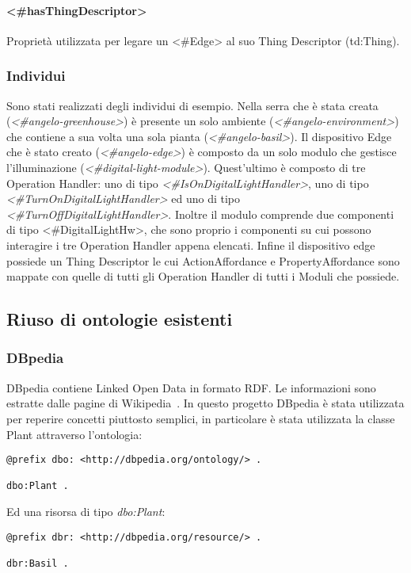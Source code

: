 \paragraph{<\#hasThingDescriptor>}
Proprietà utilizzata per legare un <\#Edge> al suo Thing Descriptor (td:Thing).

\subsubsection{Individui}
Sono stati realizzati degli individui di esempio. Nella serra che è stata creata (\textit{<\#angelo-greenhouse>}) è presente un solo ambiente (\textit{<\#angelo-environment>}) che contiene a sua volta una sola pianta (\textit{<\#angelo-basil>}). Il dispositivo Edge che è stato creato (\textit{<\#angelo-edge>}) è composto da un solo modulo che gestisce l'illuminazione (\textit{<\#digital-light-module>}). Quest'ultimo è composto di tre Operation Handler: uno di tipo \textit{<\#IsOnDigitalLightHandler>}, uno di tipo \textit{<\#TurnOnDigitalLightHandler>} ed uno di tipo \textit{<\#TurnOffDigitalLightHandler>}.
Inoltre il modulo comprende due componenti di tipo <\#DigitalLightHw>, che sono proprio i componenti su cui possono interagire i tre Operation Handler appena elencati. Infine il dispositivo edge possiede un Thing Descriptor le cui ActionAffordance e PropertyAffordance sono mappate con quelle di tutti gli Operation Handler di tutti i Moduli che possiede.

\subsection{Riuso di ontologie esistenti}
\subsubsection{DBpedia}
DBpedia contiene Linked Open Data in formato RDF. Le informazioni sono estratte dalle pagine di Wikipedia~\cite{wwwdbped0:online}.
In questo progetto DBpedia è stata utilizzata per reperire concetti piuttosto semplici, in particolare è stata utilizzata la classe Plant attraverso l'ontologia:
\begin{verbatim}
@prefix dbo: <http://dbpedia.org/ontology/> .

dbo:Plant .
\end{verbatim}
Ed una risorsa di tipo \textit{dbo:Plant}:
\begin{verbatim}
@prefix dbr: <http://dbpedia.org/resource/> .

dbr:Basil .
\end{verbatim}


